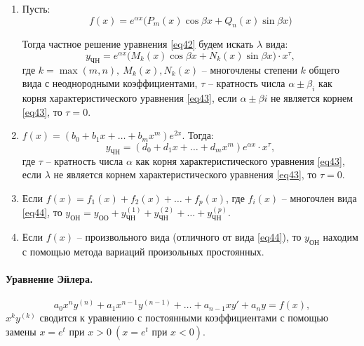 \documentclass[11pt,a4paper,oneside]{report}
\theoremstyle{definition}
\theoremstyle{plain}
\theoremstyle{remark}
\begin{document}
\begin{enumerate}
    \item Пусть:
          \begin{equation}\label{eq44}
              f(x) = e^{\alpha x}\big(P_m(x)\cos \beta x + Q_n(x)\sin \beta x \big)
          \end{equation}

          Тогда частное решение уравнения \ref{eq42} будем искать $\lambda$ вида:
          \begin{equation*}
              y_{\text{ЧН}} = e^{\alpha x}\big(M_k(x)\cos\beta x + N_k(x)\sin \beta x\big)\cdot x^\tau,
          \end{equation*}
          где $k = \max(m,n), \ M_k(x),N_k(x)$ -- многочлены степени $k$ общего вида с неоднородными коэффициентами, $\tau$ -- кратность числа $\alpha\pm\beta_i$ как корня характеристического уравнения \ref{eq43}, если $\alpha \pm\beta i$ не является корнем \ref{eq43}, то $\tau = 0$.

    \item $f(x) = (b_0 + b_1 x + \ldots + b_m x^m)e^{2x}$. Тогда:
          \begin{equation*}
              y_{\text{ЧН}} = (d_0 + d_1 x + \ldots + d_m x^m)e^{\alpha x}\cdot x^\tau,
          \end{equation*}
          где $\tau$ -- кратность числа $\alpha$ как корня характеристического уравнения \ref{eq43}, если $\lambda$ не является корнем характеристического уравнения \ref{eq43}, то $\tau = 0$.

    \item Если $f(x) = f_1(x) + f_2(x) + \ldots + f_p(x)$, где $f_i(x)$ -- многочлен вида \ref{eq44}, то $y_{\text{ОН}} = y_{\text{ОО}} + y_{\text{ЧН}}^{(1)} + y_{\text{ЧН}}^{(2)} + \ldots + y_{\text{ЧН}}^{(p)}$.

    \item Если $f(x)$ -- произвольного вида (отличного от вида \ref{eq44}), то $y_{\text{ОН}}$ находим с помощью метода вариаций произольных простоянных.
\end{enumerate}

\paragraph*{Уравнение Эйлера.}

\begin{equation*}
    a_0 x^n y^{(n)} + a_1 x^{n-1}y^{(n-1)} + \ldots + a_{n-1}x y' + a_n y = f(x),
\end{equation*}
$x^ky^{(k)}$ сводится к уравнению с постоянными коэффициентами с помощью замены $x = e^t$ при $x > 0 \ (x = e^t \text{ при }x < 0)$.
\end{document}
